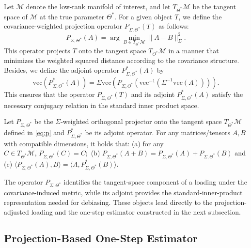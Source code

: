\documentclass[authoryear,preprint,review,12pt]{elsarticle}
\begin{document}
	Let $\mathcal{M}$ denote the low-rank manifold of interest, and let $T_{\Theta^\ast}\mathcal{M}$ be the tangent space of $\mathcal{M}$ at the true parameter $\Theta^\ast$. For a given object \( T \), we define the covariance-weighted projection operator $P_{\Sigma, \Theta^\ast}(T)$ as follows: 
	\begin{equation}
		P_{\Sigma, \Theta^\ast}(A) = \arg\min_{B \in T_{\Theta^\ast}\mathcal{M}} \| A - B \|_\Sigma^2.
		\label{eq:p}
	\end{equation}  
	This operator projects \( T \) onto the tangent space \( T_{\Theta^\ast}\mathcal{M} \) in a manner that minimizes the weighted squared distance according to the covariance structure. 
	Besides, we define the adjoint operator \( P_{\Sigma, \Theta^\ast}^\ast(A) \)  by
	\begin{equation}
		\mathrm{vec}(P_{\Sigma, \Theta^\ast}^\ast(A)) = \Sigma\mathrm{vec}(P_{\Sigma, \Theta^\ast}( \mathrm{vec}^{-1}(\Sigma^{-1}\mathrm{vec}(A)))).
		\label{eq:adjoint}
	\end{equation}
	This ensures that the operator \( P_{\Sigma, \Theta^\ast}(T) \) and its adjoint \( P_{\Sigma, \Theta^\ast}^\ast(A) \) satisfy the necessary conjugacy relation in the standard inner product space.  
	{ 
		\begin{pro}\label{pro:proj-basic}
			Let $P_{\Sigma,\Theta^\ast}$ be the $\Sigma$-weighted orthogonal projector onto the tangent space
			$T_{\Theta^\ast}\mathcal M$ defined in \eqref{eq:p} and $P_{\Sigma,\Theta^\ast}^\ast$ be its adjoint operator.
			For any matrices/tensors $A,B$ with compatible dimensions, it holds that: (a) for any $C\in T_{\Theta^\ast}\mathcal M,\, P_{\Sigma,\Theta^\ast}(C)=C;$ (b)  \( P_{\Sigma, \Theta^\ast}(A + B) =  P_{\Sigma, \Theta^\ast}(A)  + P_{\Sigma, \Theta^\ast}(B) \) and (c) \(\langle P_{\Sigma, \Theta^\ast}(A), B \rangle = \langle A, P_{\Sigma, \Theta^\ast}^\ast(B) \rangle\). 
		\end{pro} 
	}
	
	The operator   $P_{\Sigma,\Theta^\ast}$ identifies the tangent-space component of a loading under the covariance-induced metric, while its adjoint provides the standard-inner-product representation needed for debiasing. These objects lead directly to the projection-adjusted loading and the one-step estimator constructed in the next subsection.
	
	\subsection{Projection-Based One-Step Estimator}
	
\end{document}
